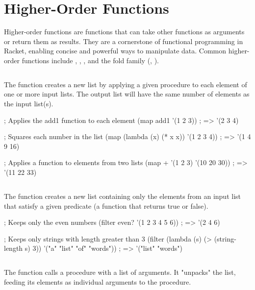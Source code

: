 
\section{Higher-Order Functions}
\label{sec:higher-order-functions}

Higher-order functions are functions that can take other functions as arguments or return them as results. They are a cornerstone of functional programming in Racket, enabling concise and powerful ways to manipulate data. Common higher-order functions include , , , and the fold family (, ).

\subsection{}
The  function creates a new list by applying a given procedure to each element of one or more input lists. The output list will have the same number of elements as the input list(s).

\begin{racketcode}
; Applies the add1 function to each element
(map add1 '(1 2 3)) ; => '(2 3 4)

; Squares each number in the list
(map (lambda (x) (* x x)) '(1 2 3 4)) ; => '(1 4 9 16)

; Applies a function to elements from two lists
(map + '(1 2 3) '(10 20 30)) ; => '(11 22 33)
\end{racketcode}

\subsection{}
The  function creates a new list containing only the elements from an input list that satisfy a given predicate (a function that returns true or false).

\begin{racketcode}
; Keeps only the even numbers
(filter even? '(1 2 3 4 5 6)) ; => '(2 4 6)

; Keeps only strings with length greater than 3
(filter (lambda (s) (> (string-length s) 3)) '("a" "list" "of" "words")) ; => '("list" "words")
\end{racketcode}

\subsection{}
The  function calls a procedure with a list of arguments. It "unpacks" the list, feeding its elements as individual arguments to the procedure.

